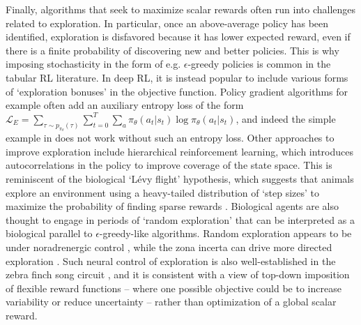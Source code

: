 Finally, algorithms that seek to maximize scalar rewards often run into challenges related to exploration.
In particular, once an above-average policy has been identified, exploration is disfavored because it has lower expected reward, even if there is a finite probability of discovering new and better policies.
This is why imposing stochasticity in the form of e.g. $\epsilon$-greedy policies is common in the tabular RL literature.
In deep RL, it is instead popular to include various forms of `exploration bonuses' in the objective function.
Policy gradient algorithms for example often add an auxiliary entropy loss of the form $\mathcal{L}_E = \sum_{\tau \sim p_{\pi_\theta}(\tau)} \sum_{t=0}^T \sum_a \pi_\theta (a_t|s_t) \log \pi_\theta (a_t|s_t)$, and indeed the simple example in  does not work without such an entropy loss.
Other approaches to improve exploration include hierarchical reinforcement learning, which introduces autocorrelations in the policy to improve coverage of the state space.
This is reminiscent of the biological `Lévy flight' hypothesis, which suggests that animals explore an environment using a heavy-tailed distribution of `step sizes' to maximize the probability of finding sparse rewards \citep{viswanathan1999optimizing}.
Biological agents are also thought to engage in periods of `random exploration' that can be interpreted as a biological parallel to $\epsilon$-greedy-like algorithms.
Random exploration appears to be under noradrenergic control \citep{tervo2014behavioral, dubois2021human}, while the zona incerta can drive more directed exploration \citep{ahmadlou2021cell}.
Such neural control of exploration is also well-established in the zebra finch song circuit \citep{olveczky2005vocal}, and it is consistent with a view of top-down imposition of flexible reward functions -- where one possible objective could be to increase variability or reduce uncertainty -- rather than optimization of a global scalar reward.



